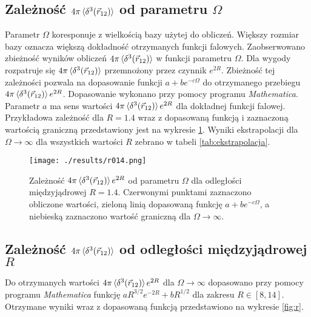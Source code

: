 \documentclass[a4paper,12pt]{article}
\numberwithin{equation}{section}
\numberwithin{table}{section}
\numberwithin{figure}{section}
\begin{document}
\subsection{Zależność $4\pi\braket{\delta^3(\vec{r}_{12})}$ od parametru $\Omega$}
Parametr $\Omega$ koresponuje z wielkością bazy użytej do obliczeń. Większy rozmiar bazy oznacza większą dokładność otrzymanych funkcji falowych. Zaobserwowano zbieżność wyników obliczeń $4\pi\braket{\delta^3(\vec{r}_{12})}$ w funkcji parametru $\Omega$. Dla wygody rozpatruje się $4\pi\braket{\delta^3(\vec{r}_{12})}$ przemnożony przez czynnik $e^{2R}$. Zbieżność tej zależności pozwala na dopasowanie funkcji $a + b e^{-c\Omega}$ do otrzymanego przebiegu $4\pi\braket{\delta^3(\vec{r}_{12})}e^{2R}$. Dopasowanie wykonano przy pomocy programu \emph{Mathematica}. Parametr $a$ ma sens wartości $4\pi\braket{\delta^3(\vec{r}_{12})}e^{2R}$ dla dokładnej funkcji falowej. Przykładowa zależność dla $R = 1.4$ wraz z dopasowaną funkcją i zaznaczoną wartością graniczną przedstawiony jest na wykresie \ref{fig:omega}. Wyniki ekstrapolacji dla $\Omega \rightarrow \infty$ dla wszystkich wartości $R$ zebrano w tabeli \ref{tab:ekstrapolacja}.
\begin{figure}[h!] 
\label{fig:omega}
  \centering
    \texttt{[image: ./results/r014.png]}
    \caption{Zależność $4\pi\braket{\delta^3(\vec{r}_{12})}e^{2R}$ od parametru $\Omega$ dla odległości międzyjądrowej $R=1.4$. Czerwonymi punktami zaznaczono obliczone wartości, zieloną linią dopasowaną funkcję $a + b e^{-c\Omega}$, a niebieską zaznaczono wartość graniczną dla $\Omega \rightarrow \infty$.}
\end{figure}
\subsection{Zależność $4\pi\braket{\delta^3(\vec{r}_{12})}$ od odległości międzyjądrowej $R$}
Do otrzymanych wartości $4\pi\braket{\delta^3(\vec{r}_{12})}e^{2R}$ dla $\Omega \rightarrow \infty$ dopasowano przy pomocy programu \emph{Mathematica} funkcję $a R^{3/2} e^{-2R}+b R^{1/2}$ dla zakresu $R \in [8,14]$. Otrzymane wyniki wraz z dopasowaną funkcją przedstawiono na wykresie \ref{fig:r}.
\end{document}
